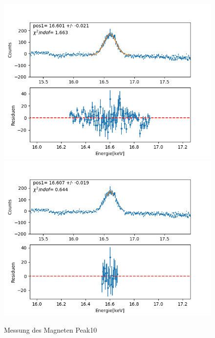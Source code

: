 \documentclass[12pt,a4paper]{article}
\begin{document}
\begin{figure}[H]
\centering
\includegraphics[scale=0.49]{Bilder/roentgen_spektren/magnet/mag10_1.png}
\includegraphics[scale=0.49]{Bilder/roentgen_spektren/magnet/mag10_2.png}
\caption{Messung des Magneten Peak10}
\end{figure}
\end{document}
